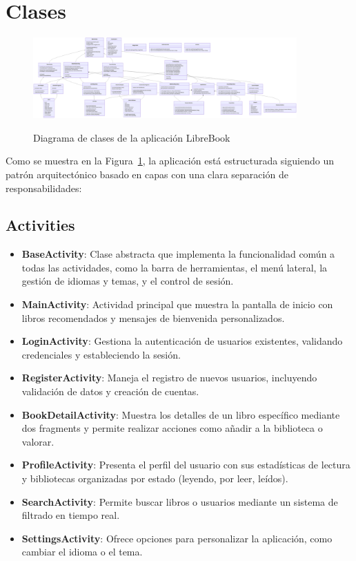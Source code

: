 \documentclass[a4paper,12pt]{report}
\begin{document}
    \section{Clases}
      \begin{figure}[H]
        \centering
        \href{https://raw.githubusercontent.com/Xabierland/DAS-Proyecto/refs/heads/main/Documentation/.img/diagrama-clases.svg}{%
          \includegraphics[width=0.9\textwidth]{.img/diagrama-clases.png} 
        }
        \caption{Diagrama de clases de la aplicación LibreBook}
        \label{fig:diagrama-clases}
      \end{figure}
      Como se muestra en la Figura~\ref{fig:diagrama-clases}, la aplicación está estructurada siguiendo un patrón arquitectónico basado en capas con una clara separación de responsabilidades\cite{android_architecture}:
      \subsection{Activities}
      \begin{itemize}
        \item \textbf{BaseActivity}: Clase abstracta que implementa la funcionalidad común a todas las actividades, como la barra de herramientas, el menú lateral, la gestión de idiomas y temas, y el control de sesión.
        \item \textbf{MainActivity}: Actividad principal que muestra la pantalla de inicio con libros recomendados y mensajes de bienvenida personalizados.
        \item \textbf{LoginActivity}: Gestiona la autenticación de usuarios existentes, validando credenciales y estableciendo la sesión.
        \item \textbf{RegisterActivity}: Maneja el registro de nuevos usuarios, incluyendo validación de datos y creación de cuentas.
        \item \textbf{BookDetailActivity}: Muestra los detalles de un libro específico mediante dos fragments y permite realizar acciones como añadir a la biblioteca o valorar.
        \item \textbf{ProfileActivity}: Presenta el perfil del usuario con sus estadísticas de lectura y bibliotecas organizadas por estado (leyendo, por leer, leídos).
        \item \textbf{SearchActivity}: Permite buscar libros o usuarios mediante un sistema de filtrado en tiempo real.
        \item \textbf{SettingsActivity}: Ofrece opciones para personalizar la aplicación, como cambiar el idioma o el tema.
      \end{itemize}
\end{document}
